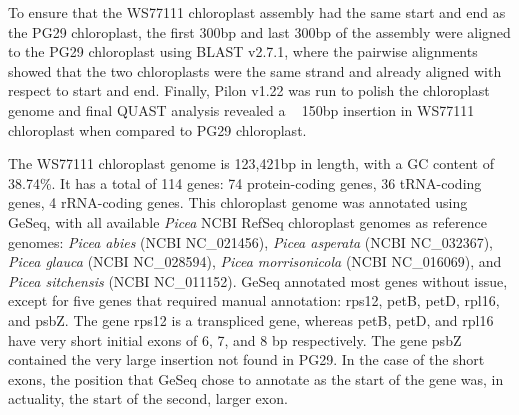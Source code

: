 \documentclass[titlepage,11pt, oneside]{article}   	%
\begin{document}
To ensure that the WS77111 chloroplast assembly had the same start and end as the PG29 chloroplast, the first 300bp and last 300bp of the assembly were aligned to the PG29 chloroplast using BLAST v2.7.1, where the pairwise alignments showed that the two chloroplasts were the same strand and already aligned with respect to start and end. Finally, Pilon v1.22 was run to polish the chloroplast genome and final QUAST analysis revealed a ~ 150bp insertion in WS77111 chloroplast when compared to PG29 chloroplast.

The WS77111 chloroplast genome is 123,421bp in length, with a GC content of 38.74\%. It has a total of 114 genes: 74 protein-coding genes, 36 tRNA-coding genes, 4 rRNA-coding genes. This chloroplast genome was annotated using GeSeq, with all available \textit{Picea} NCBI RefSeq chloroplast genomes as reference genomes: \textit{Picea abies} (NCBI NC\_021456), \textit{Picea asperata} (NCBI NC\_032367), \textit{Picea glauca} (NCBI NC\_028594), \textit{Picea morrisonicola} (NCBI NC\_016069), and \textit{Picea sitchensis} (NCBI NC\_011152). GeSeq annotated most genes without issue, except for five genes that required manual annotation: rps12, petB, petD, rpl16, and psbZ. The gene rps12 is a transpliced gene, whereas petB, petD, and rpl16 have very short initial exons of 6, 7, and 8 bp respectively. The gene psbZ contained the very large insertion not found in PG29. In the case of the short exons, the position that GeSeq chose to annotate as the start of the gene was, in actuality, the start of the second, larger exon.
\end{document}
